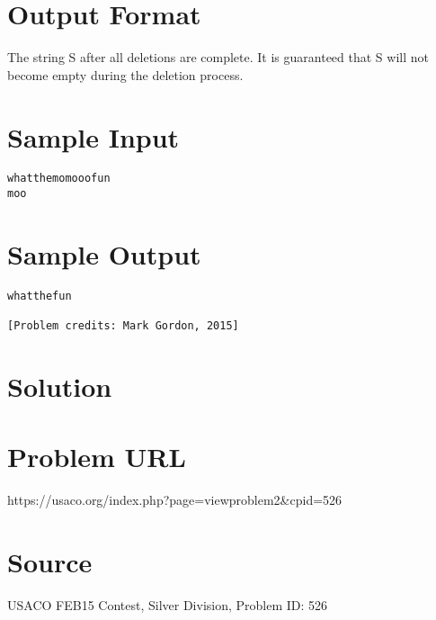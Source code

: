 \documentclass[12pt]{article}
\begin{document}
\section*{Output Format}
The string S after all deletions are complete.  It is guaranteed that
S will not become empty during the deletion process.

\section*{Sample Input}
\begin{verbatim}
whatthemomooofun
moo
\end{verbatim}

\section*{Sample Output}
\begin{verbatim}
whatthefun

[Problem credits: Mark Gordon, 2015]
\end{verbatim}

\section*{Solution}


\section*{Problem URL}
https://usaco.org/index.php?page=viewproblem2&cpid=526

\section*{Source}
USACO FEB15 Contest, Silver Division, Problem ID: 526
\end{document}

